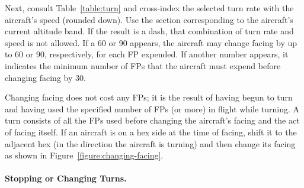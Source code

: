 {Next, consult Table~\ref{table:turn} and cross-index the selected turn rate with the aircraft’s speed (rounded down). Use the section corresponding to the aircraft’s current altitude band. If the result is a dash, that combination of turn rate and speed is not allowed. If a 60 or 90 appears, the aircraft may change facing by up to 60{\deg} or 90{\deg}, respectively, for each FP expended. If another number appears, it indicates the minimum number of FPs that the aircraft must expend before changing facing by 30{\deg}.


Changing facing does not cost any FPs; it is the result of having begun to turn and having used the specified number of FPs (or more) in flight while turning. A turn consists of all the FPs used before changing the aircraft’s facing and the act of facing itself. If an aircraft is on a hex side at the time of facing, shift it to the adjacent hex (in the direction the aircraft is turning) and then change its facing as shown in Figure~\ref{figure:changing-facing}.
}



\paragraph{Stopping or Changing Turns.} 
